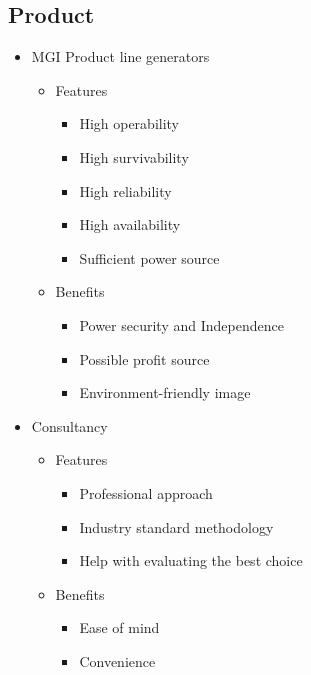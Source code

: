 \documentclass[a4paper,11pt]{article}
\begin{document}
\subsection{Product}
\begin{itemize}
	\item MGI Product line generators
	
	\begin{itemize}
		\item Features
		
		\begin{itemize}
			\item High operability
			\item High survivability
			\item High reliability
			\item High availability
			\item Sufficient power source
		\end{itemize}
		
		\item Benefits
		
		\begin{itemize}
			\item Power security and Independence
			\item Possible profit source
			\item Environment-friendly image
		\end{itemize}
	\end{itemize}
	
	\item Consultancy
	
	\begin{itemize}
		\item Features
		
		\begin{itemize}
			\item Professional approach
			\item Industry standard methodology
			\item Help with evaluating the best choice
		\end{itemize}
		
		\item Benefits
		
		\begin{itemize}
			\item Ease of mind
			\item Convenience
		\end{itemize}
	\end{itemize}
	

\end{itemize}
\end{document}
